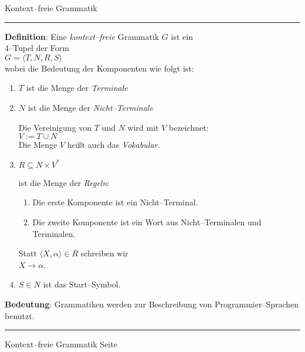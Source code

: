 \documentclass{slides}
\newcounter{mypage}
\begin{document}
\begin{center}
Kontext--freie Grammatik
\end{center}


\rule{17cm}{1mm}

\footnotesize
\vspace*{0.2cm}
\textbf{Definition}: Eine \emph{kontext--freie} Grammatik $G$ ist ein \\
\hspace*{3.5cm} 4--Tupel der Form \\[0.3cm]
\hspace*{4.3cm} $G = \langle T, N, R, S \rangle$ \\[0.3cm]
wobei die Bedeutung der Komponenten wie folgt ist:
\begin{enumerate}
\item $T$ ist die Menge der \emph{Terminale}
\item $N$ ist die Menge der \emph{Nicht--Terminale}

      Die Vereinigung von $T$ und $N$ wird mit $V$ bezeichnet: \\[0.3cm]
      \hspace*{1.3cm} $V := T \cup N$ \\[0.3cm]
      Die Menge $V$ hei{\ss}t auch das \emph{Vokabular}.
\item $R \subseteq N \times V^*$ 

      ist die Menge der \emph{Regeln}:
      \begin{enumerate}
      \item Die erste Komponente ist ein Nicht--Terminal.
      \item Die zweite Komponente ist ein Wort aus  Nicht--Terminalen und Terminalen.
      \end{enumerate}
      Statt $\langle X, \alpha \rangle \in R$ schreiben wir \\[0.3cm]
      \hspace*{1.3cm} $X \rightarrow \alpha$.
\item $S \in N$ ist das Start--Symbol.
\end{enumerate}
\textbf{Bedeutung}: Grammatiken werden zur Beschreibung von Programmier--Sprachen benutzt.

\scriptsize

\vspace*{\fill}
\tiny \addtocounter{mypage}{1}
\rule{17cm}{1mm}
Kontext--freie Grammatik  \hspace*{\fill} Seite 



\end{document}
